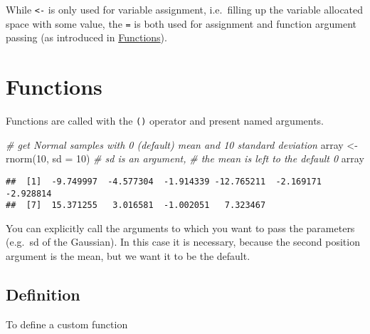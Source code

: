 \documentclass[
  oneside]{book}
\newenvironment{Shaded}{\begin{snugshade}}{\end{snugshade}}
\newcommand{\AttributeTok}[1]{\textcolor[rgb]{0.77,0.63,0.00}{#1}}
\newcommand{\CommentTok}[1]{\textcolor[rgb]{0.56,0.35,0.01}{\textit{#1}}}
\newcommand{\DecValTok}[1]{\textcolor[rgb]{0.00,0.00,0.81}{#1}}
\newcommand{\FunctionTok}[1]{\textcolor[rgb]{0.00,0.00,0.00}{#1}}
\newcommand{\NormalTok}[1]{#1}
\newcommand{\OtherTok}[1]{\textcolor[rgb]{0.56,0.35,0.01}{#1}}
\begin{document}
While \texttt{\textless{}-} is only used for variable assignment, i.e.~filling up the variable
allocated space with some value, the \texttt{=} is both used for assignment and
function argument passing (as introduced in \protect\hyperlink{functions}{Functions}).

\hypertarget{functions}{%
\section{Functions}\label{functions}}

Functions are called with the \texttt{()} operator and present named arguments.

\begin{Shaded}
\begin{Highlighting}[]
\CommentTok{\# get Normal samples with 0 (default) mean and 10 standard deviation}
\NormalTok{array }\OtherTok{\textless{}{-}} \FunctionTok{rnorm}\NormalTok{(}\DecValTok{10}\NormalTok{, }\AttributeTok{sd =} \DecValTok{10}\NormalTok{) }\CommentTok{\# sd is an argument,}
                            \CommentTok{\# the mean is left to the default 0}
\NormalTok{array}
\end{Highlighting}
\end{Shaded}

\begin{verbatim}
##  [1]  -9.749997  -4.577304  -1.914339 -12.765211  -2.169171  -2.928814
##  [7]  15.371255   3.016581  -1.002051   7.323467
\end{verbatim}

You can explicitly call the arguments to which you want to pass the parameters
(e.g.~sd of the Gaussian). In this case it is necessary, because the second
position argument is the mean, but we want it to be the default.

\hypertarget{definition}{%
\subsection{Definition}\label{definition}}

To define a custom function
\end{document}

